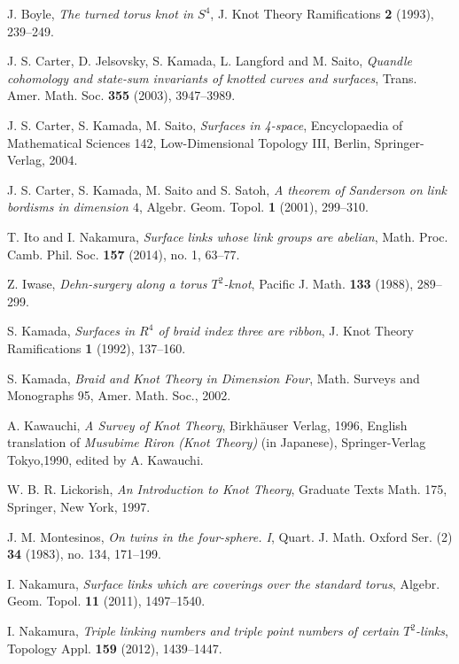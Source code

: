 \documentclass[a4paper,11pt]{amsart}
\numberwithin{equation}{section}
\begin{document}
\begin{thebibliography}{0}

J. Boyle, {\it The turned torus knot in $S^4$}, J. Knot Theory Ramifications 
\textbf{2} (1993), 239--249.

J. S. Carter, D. Jelsovsky, S. Kamada, L. Langford and M. Saito, 
{\it Quandle cohomology and state-sum invariants of knotted curves and surfaces}, 
Trans. Amer. Math. Soc. {\bf 355} (2003), 3947--3989.

J. S. Carter, S. Kamada, M. Saito, 
{\it Surfaces in 4-space}, Encyclopaedia of Mathematical Sciences 142, Low-Dimensional Topology III, Berlin, Springer-Verlag, 2004. 

J. S. Carter, S. Kamada, M. Saito and S. Satoh, 
{\it A theorem of Sanderson on link bordisms in dimension $4$}, Algebr. Geom. Topol. {\bf 1} (2001), 299--310. 

T. Ito and I. Nakamura, {\it Surface links whose link groups are abelian}, Math. Proc. Camb. Phil. Soc. {\bf 157} (2014), no. 1, 63--77.

 Z. Iwase, {\it Dehn-surgery along a torus $T^2$-knot}, 
 Pacific J. Math. \textbf{133} (1988), 289--299.

S. Kamada, {\it Surfaces in $R^4$ of braid index three are ribbon}, J. Knot Theory Ramifications {\bf 1} (1992), 137--160. 

S. Kamada, {\it Braid and Knot Theory in Dimension Four}, Math. Surveys and Monographs 95, Amer. Math. Soc., 2002. 
  

A. Kawauchi, {\it A Survey of Knot Theory}, Birkh\"auser Verlag, 1996,
English translation of {\it Musubime Riron (Knot Theory)} (in Japanese), Springer-Verlag Tokyo,1990, edited by A. Kawauchi.

W. B. R. Lickorish, {\it An Introduction to Knot Theory}, Graduate Texts Math. 175, Springer, New York, 1997.

J. M. Montesinos, {\it On twins in the four-sphere. I}, Quart. J. Math. Oxford Ser. (2) {\bf 34} (1983), no. 134, 171--199. 

I. Nakamura, {\it Surface links which are coverings over the standard torus}, Algebr. Geom. Topol. {\bf 11} (2011), 1497--1540. 

I. Nakamura, {\it Triple linking numbers and triple point numbers of certain $T^2$-links}, Topology Appl. {\bf 159} (2012), 1439--1447. 


\end{thebibliography}
\end{document}
